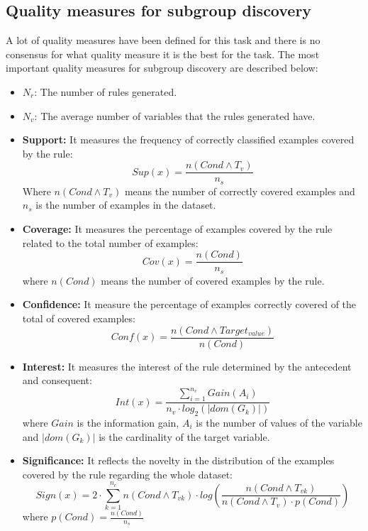 \documentclass[]{article}
\begin{document}
\subsection{Quality measures for subgroup discovery
\label{medidas}}\label{quality-measures-for-subgroup-discovery}

A lot of quality measures have been defined for this task and there is
no consensus for what quality measure it is the best for the task. The
most important quality measures for subgroup discovery are described
below\cite{kais}:

\begin{itemize}
  
  \item $N_r$: The number of rules generated.
  \item $N_v$: The average number of variables that the rules generated have.
  \item \textbf{Support:} It measures the frequency of correctly classified examples covered by the rule: \begin{equation} Sup(x)= \frac{n(Cond \wedge  T_v)}{n_s} \label{support} \end{equation} Where $n(Cond \wedge  T_v)$ means the number of correctly covered examples  and $n_s$ is the number of examples in the dataset.  
  \item \textbf{Coverage:} It measures the percentage of examples covered by the rule related to the total number of examples: \begin{equation} Cov(x)= \frac{n(Cond)}{n_s} \label{coverage} \end{equation} where $n(Cond)$ means the number of covered examples by the rule.
  \item \textbf{Confidence:} It measure the percentage of examples correctly covered of the total of covered examples: \begin{equation} Conf(x) = \frac{n(Cond  \wedge Target_{value})}{n(Cond)} \label{confidence} \end{equation}
  \item \textbf{Interest:} It measures the interest of the rule determined by the antecedent and consequent: \begin{equation} Int(x) = \frac{\sum_{i = 1}^{n_v}Gain(A_i)}{n_v \cdot log_2(|dom(G_k)|)} \label{Interest} \end{equation} where $Gain$ is the information gain, $A_i$ is the number of values of the variable and $|dom(G_k)|$ is the cardinality of the target variable.
  \item \textbf{Significance:} It reflects the novelty in the distribution of the examples covered by the rule regarding the whole dataset: \begin{equation} Sign(x) = 2 \cdot \sum_{k=1}^{n_c}n(Cond \wedge T_{vk}) \cdot log(\frac{n(Cond \wedge T_{vk})}{n(Cond \wedge T_v) \cdot p(Cond)}) \label{Significance} \end{equation} where $p(Cond) = \frac{n(Cond)}{n_s}$

\end{itemize}
\end{document}
